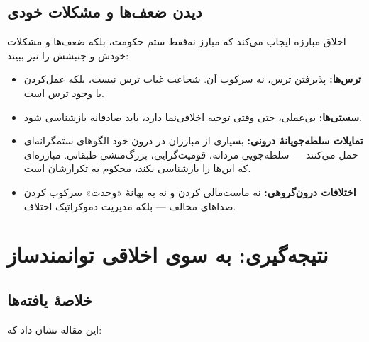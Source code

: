 \subsection{دیدن ضعف‌ها و مشکلات خودی}

\begin{tcolorbox}[warnbox, title={\textbf{آینه‌ای ناخوشایند اما ضروری}}]
اخلاق مبارزه ایجاب می‌کند که مبارز نه‌فقط ستم حکومت، بلکه ضعف‌ها و 
مشکلات خودش و جنبشش را نیز ببیند:
\begin{itemize}
\item \textbf{ترس‌ها:} پذیرفتن ترس، نه سرکوب آن. شجاعت غیاب ترس نیست، 
بلکه عمل‌کردن با وجود ترس است.
\item \textbf{سستی‌ها:} بی‌عملی، حتی وقتی توجیه اخلاقی‌نما دارد، باید 
صادقانه بازشناسی شود.
\item \textbf{تمایلات سلطه‌جویانهٔ درونی:} بسیاری از مبارزان در درون خود 
الگوهای ستمگرانه‌ای حمل می‌کنند — سلطه‌جویی مردانه، قومیت‌گرایی، 
بزرگ‌منشی طبقاتی. مبارزه‌ای که این‌ها را بازشناسی نکند، محکوم به 
تکرارشان است.
\item \textbf{اختلافات درون‌گروهی:} نه ماست‌مالی کردن و نه به بهانهٔ 
«وحدت» سرکوب کردن صداهای مخالف — بلکه مدیریت دموکراتیک اختلاف.
\end{itemize}
\end{tcolorbox}



\newpage
\section{نتیجه‌گیری: به سوی اخلاقی توانمندساز}

\subsection{خلاصهٔ یافته‌ها}

این مقاله نشان داد که:

